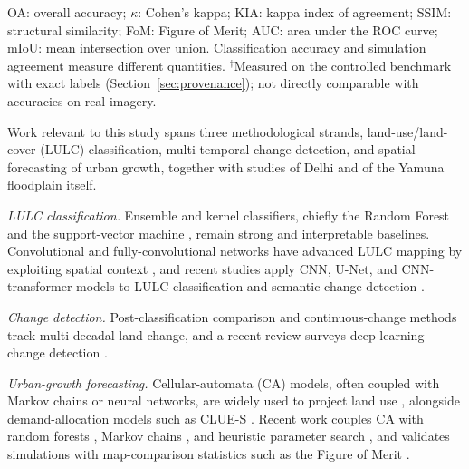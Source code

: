 \documentclass[journal]{IEEEtran}
\begin{document}
\begin{table}[!t]
\vspace{3pt}
\parbox{\textwidth}{\scriptsize OA: overall accuracy; $\kappa$: Cohen's kappa; KIA: kappa index of agreement; SSIM: structural similarity; FoM: Figure of Merit; AUC: area under the ROC curve; mIoU: mean intersection over union. Classification accuracy and simulation agreement measure different quantities. $^{\dagger}$Measured on the controlled benchmark with exact labels (Section~\ref{sec:provenance}); not directly comparable with accuracies on real imagery.}
\end{table}
Work relevant to this study spans three methodological strands, land-use/land-cover (LULC) classification, multi-temporal change detection, and spatial forecasting of urban growth, together with studies of Delhi and of the Yamuna floodplain itself.

\emph{LULC classification.} Ensemble and kernel classifiers, chiefly the Random Forest \cite{breiman2001random,belgiu2016random,gislason2006random,pal2005random} and the support-vector machine \cite{cortes1995svm,maxwell2018implementation}, remain strong and interpretable baselines. Convolutional and fully-convolutional networks have advanced LULC mapping by exploiting spatial context \cite{long2015fully,ronneberger2015unet,zhu2017deep,ma2019deep}, and recent studies apply CNN, U-Net, and CNN-transformer models to LULC classification and semantic change detection \cite{liu2024multitask,tarafdar2025cnn,pushpalatha2025lulc,ramos2025unet}.

\emph{Change detection.} Post-classification comparison \cite{singh1989digital,lu2004change} and continuous-change methods \cite{zhu2014continuous} track multi-decadal land change, and a recent review surveys deep-learning change detection \cite{bai2023deep}.

\emph{Urban-growth forecasting.} Cellular-automata (CA) models, often coupled with Markov chains or neural networks, are widely used to project land use \cite{yang2014markov,gui2025cellular}, alongside demand-allocation models such as CLUE-S \cite{verburg2002clue}. Recent work couples CA with random forests \cite{lv2021simulating}, Markov chains \cite{tariq2023series}, and heuristic parameter search \cite{tang2024urban}, and validates simulations with map-comparison statistics such as the Figure of Merit \cite{pontius2008comparing}.
\end{document}
